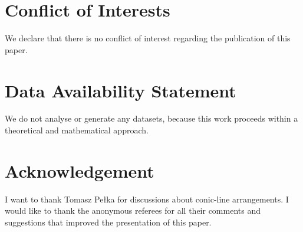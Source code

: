 \documentclass[12pt]{article}
\theoremstyle{plain}
\theoremstyle{definition}
\begin{document}
\section*{Conflict of Interests}
We declare that there is no conflict of interest regarding the publication of this paper.
\section*{Data Availability Statement}
We do not analyse or generate any datasets, because this work proceeds within a theoretical and mathematical approach. 
\section*{Acknowledgement}
I want to thank Tomasz Pe\l ka for discussions about conic-line arrangements. I would like to thank the anonymous referees for all their comments and suggestions that improved the presentation of this paper. 
\end{document}
